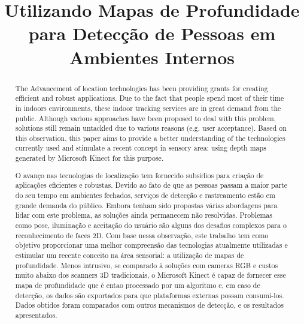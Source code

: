 \documentclass[conference]{IEEEtran}
\begin{document}
\title{Utilizando Mapas de Profundidade para Detecção de Pessoas em Ambientes Internos}

\author{

\and
{}
}

\maketitle

{
\begin{abstract}
The Advancement of location technologies has been providing grants for creating efficient and robust applications. Due to the fact that people spend most of their time in indoors environments, these indoor tracking services are in great demand from the public. Although various approaches have been proposed to deal with this problem, solutions still remain untackled due to various reasons (e.g. user acceptance). Based on this observation, this paper aims to provide a better understanding of the technologies currently used and stimulate a recent concept in sensory area: using depth maps generated by Microsoft Kinect for this purpose.
\end{abstract}}

\begin{abstract}
O avanço nas tecnologias de localização tem fornecido subsídios para criação de aplicações eficientes e robustas. Devido ao fato de que as pessoas passam a maior parte do seu tempo em ambientes fechados, serviços de detecção e rastreamento estão em grande demanda do público. Embora tenham sido propostas várias abordagens para lidar com este problema, as soluções ainda permanecem não resolvidas. Problemas como pose, iluminação e aceitação do usuário são alguns dos desafios complexos para o reconhecimento de faces 2D. Com base nessa observação, este trabalho tem como objetivo proporcionar uma melhor compreensão das tecnologias atualmente utilizadas e estimular um recente conceito na área sensorial: a utilização de mapas de profundidade. Menos intrusivo, se comparado à soluções com cameras RGB e custos muito abaixo dos scanners 3D tradicionais, o Microsoft Kinect é capaz de fornecer esse mapa de profundidade que é entao processado por um algoritmo e, em caso de detecção, os dados são exportados para que plataformas externas possam consumí-los. Dados obtidos foram comparados com outros mecanismos de detecção, e os resultados apresentados.  
\end{abstract}
\end{document}
